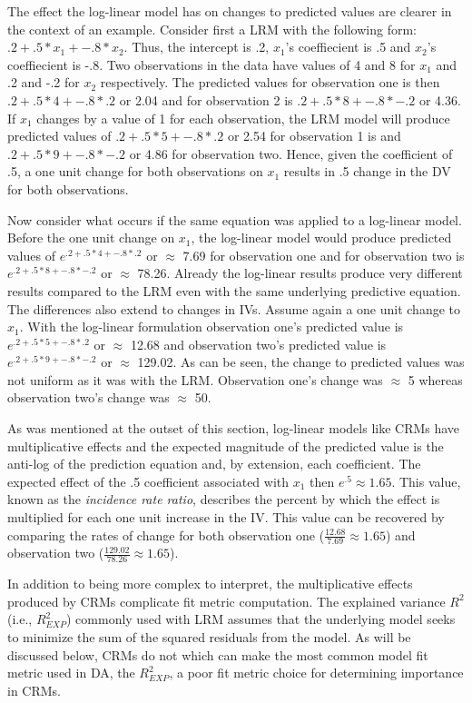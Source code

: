\documentclass[ShortAfour,times,sageapa]{sagej}
\begin{document}
	The effect the log-linear model has on changes to predicted values are clearer in the context of an example.
	Consider first a LRM with the following form: $.2 + .5*x_1 + -.8*x_2$.  
	Thus, the intercept is .2, $x_1$'s coeffiecient is .5 and $x_2$'s coeffiecient is -.8.  
	Two observations in the data have values of 4 and 8 for $x_1$ and .2 and -.2 for $x_2$ respectively.  
	The predicted values for observation one is then $.2 + .5*4 + -.8*.2$ or 2.04 and for observation 2 is $.2 + .5*8 + -.8*-.2$ or 4.36.  
	If $x_1$ changes by a value of 1 for each observation, the LRM model will produce predicted values of  $.2 + .5*5 + -.8*.2$ or 2.54 for observation 1 is and $.2 + .5*9 + -.8*-.2$ or 4.86 for observation two. 
	Hence, given the coefficient of .5, a one unit change for both observations on $x_1$ results in .5 change in the DV for both observations.
	
	Now consider what occurs if the same equation was applied to a log-linear model.  
	Before the one unit change on $x_1$, the log-linear model would produce predicted values of $e^{.2 + .5*4 + -.8*.2}$ or $\approx$ 7.69 for observation one and for observation two is $e^{.2 + .5*8 + -.8*-.2}$ or $\approx$ 78.26.  
	Already the log-linear results produce very different results compared to the LRM even with the same underlying predictive equation.  
	The differences also extend to changes in IVs.  
	Assume again a one unit change to $x_1$.  With the log-linear formulation observation one's predicted value is $e^{.2 + .5*5 + -.8*.2}$ or $\approx$ 12.68 and observation two's predicted value is $e^{.2 + .5*9 + -.8*-.2}$ or $\approx$ 129.02. As can be seen, the change to predicted values was not uniform as it was with the LRM. 
	Observation one's change was $\approx$ 5 whereas observation two's change was $\approx$ 50.
	
	As was mentioned at the outset of this section, log-linear models like CRMs have multiplicative effects and the expected magnitude of the predicted value is the anti-log of the prediction equation and, by extension, each coefficient.
	The expected effect of the .5 coefficient associated with $x_1$ then $e^{.5} \approx 1.65$.  
	This value, known as the \textit{incidence rate ratio}, describes the percent by which the effect is multiplied for each one unit increase in the IV.  
	This value can be recovered by comparing the rates of change for both observation one ($\frac{12.68}{7.69} \approx 1.65$) and observation two ($\frac{129.02}{78.26} \approx 1.65$).
	
	In addition to being more complex to interpret, the multiplicative effects produced by CRMs complicate fit metric computation.
	The explained variance $R^2$ (i.e., $R^2_{EXP}$) commonly used with LRM assumes that the underlying model seeks to minimize the sum of the squared residuals from the model.  
	As will be discussed below, CRMs do not which can make the most common model fit metric used in DA, the $R^2_{EXP}$, a poor fit metric choice for determining importance in CRMs.
	
\end{document}
